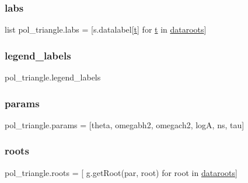 \subsubsection{\texorpdfstring{labs}{labs}}
{\footnotesize\ttfamily list pol\+\_\+triangle.\+labs = \mbox{[}s.\+datalabel\mbox{[}\mbox{\hyperlink{plotcls_8m_aaccc9105df5383111407fd5b41255e23}{t}}\mbox{]} for \mbox{\hyperlink{plotcls_8m_aaccc9105df5383111407fd5b41255e23}{t}} in \mbox{\hyperlink{namespacepol__triangle_a4220a5df3c7ccedd4d483fb63f8cb7a4}{dataroots}}\mbox{]}}

\mbox{\label{namespacepol__triangle_a98be3676e5b771ea1597f344fa600892}} 
\subsubsection{\texorpdfstring{legend\+\_\+labels}{legend\_labels}}
{\footnotesize\ttfamily pol\+\_\+triangle.\+legend\+\_\+labels}

\mbox{\label{namespacepol__triangle_a4e724aeef23dd4a82da9b3774488a3f1}} 
\subsubsection{\texorpdfstring{params}{params}}
{\footnotesize\ttfamily pol\+\_\+triangle.\+params = \mbox{[}\textquotesingle{}theta\textquotesingle{}, \textquotesingle{}omegabh2\textquotesingle{}, \textquotesingle{}omegach2\textquotesingle{}, \textquotesingle{}logA\textquotesingle{}, \textquotesingle{}ns\textquotesingle{}, \textquotesingle{}tau\textquotesingle{}\mbox{]}}

\mbox{\label{namespacepol__triangle_a0232797c8ce2f3f31185ea5456bfc1ca}} 
\subsubsection{\texorpdfstring{roots}{roots}}
{\footnotesize\ttfamily pol\+\_\+triangle.\+roots = \mbox{[} g.\+get\+Root(par, root) for root in \mbox{\hyperlink{namespacepol__triangle_a4220a5df3c7ccedd4d483fb63f8cb7a4}{dataroots}}\mbox{]}}

